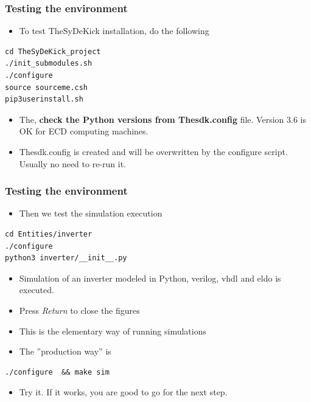 \documentclass[logo=bluequo,normaltitle]{aaltoslides}
\begin{document}

\begin{frame}[t,fragile]
    \frametitle{Testing the environment} 
    \begin{itemize}
            \item To test TheSyDeKick installation, do the following
        \end{itemize}
\begin{lstlisting}
cd TheSyDeKick_project
./init_submodules.sh     
./configure              
source sourceme.csh           
pip3userinstall.sh   
\end{lstlisting}
\begin{itemize}
    \item The, \textbf{check the Python versions from Thesdk.config} file. Version 3.6 is OK
        for ECD computing machines.
    \item Thesdk.config is created and will be overwritten by the configure
        script. Usually no need to re-run it. 
\end{itemize}

\end{frame}

\begin{frame}[t,fragile]
    \frametitle{Testing the environment} 
    \begin{itemize}
            \item Then we test the simulation execution
        \end{itemize}
\begin{lstlisting}
cd Entities/inverter     
./configure              
python3 inverter/__init__.py  
\end{lstlisting}
\begin{itemize}
    \item Simulation of an inverter modeled in Python, verilog, vhdl and eldo
        is executed. 
    \item Press \emph{Return} to close the figures
    \item This is the elementary way of running simulations
    \item The ''production way'' is 
\end{itemize}
\begin{lstlisting}
./configure  && make sim          
\end{lstlisting}
\begin{itemize}
    \item Try it. If it works, you are good to go for the next step.
\end{itemize}
\end{frame}
\end{document}
